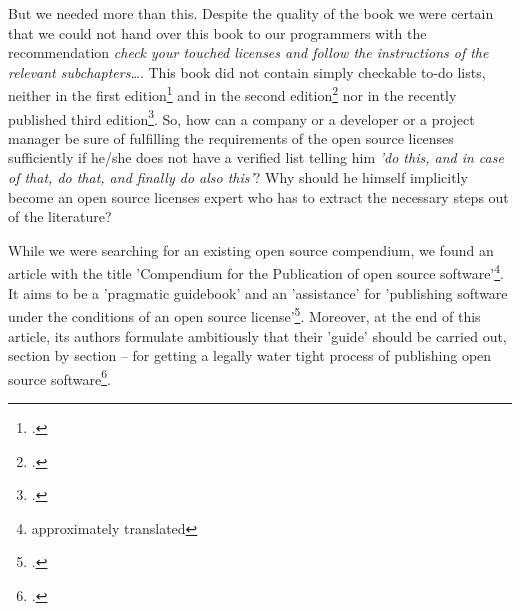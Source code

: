 But we needed more than this. Despite the quality of the book we were certain
that we could not hand over this book to our programmers with the recommendation
\textit{check your touched licenses and follow the instructions of the relevant
subchapters\ldots}. This book did not contain simply checkable to-do lists,
neither in the first edition\footcite[cf.][VIff]{JaeMet2002a} and in the second
edition\footcite[cf.][VIIff]{JaeMet2006a} nor in the recently published third
edition\footcite[cf.][VIIIff. Naturally we use this latest edition for adopting
or discussing systematical aspects]{JaeMet2011a}. So, how can a company or a
developer or a project manager be sure of fulfilling the requirements of the
open source licenses sufficiently if he/she does not have a verified list
telling him \textit{'do this, and in case of that, do that, and finally do also
this'}? Why should he himself implicitly become an open source licenses expert
who has to extract the necessary steps out of the literature?

While we were searching for an existing open source compendium, we found an
article with the title 'Compendium for the Publication of open source
software'\footnote{approximately translated}. It aims to be a 'pragmatic
guidebook' and an 'assistance' for 'publishing software under the conditions of
an open source license'\footcite[cf.][166f (originally: ein
\enquote{pragmatischer Ratgeber} zur \enquote{Veröffentlichung einer Software
unter den Rahmenbedingungen einer Open-Source-Lizenz}) ]{BreGlaGra2008a}.
Moreover, at the end of this article, its authors formulate ambitiously that
their 'guide' should be carried out, section by section -- for getting a legally
water tight process of publishing open source software\footcite[cf.][186
(originally: ein \enquote{Ratgeber}, der es erlaubt \enquote{ (\ldots) die zu
berücksichtigende Aspekte (strukturiert abzuarbeiten) (\ldots) } und einen
\enquote{rechtlich nicht angreifbaren Veröffentlichungsprozess} zu
ermöglichen) ]{BreGlaGra2008a}.

